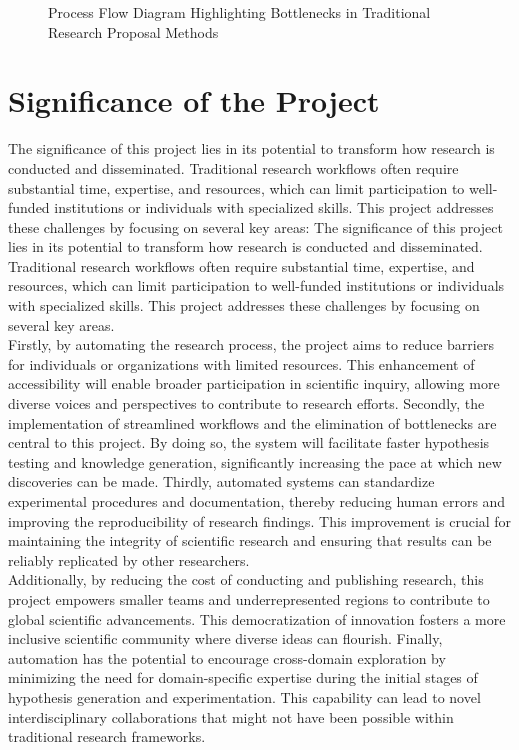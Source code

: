 \begin{figure}[htbp]
    \caption{Process Flow Diagram Highlighting Bottlenecks in Traditional Research Proposal Methods}
    \label{fig:bottlenecks} %
\end{figure}



\section{Significance of the Project}
The significance of this project lies in its potential to transform how research is conducted and disseminated. Traditional research workflows often require substantial time, expertise, and resources, which can limit participation to well-funded institutions or individuals with specialized skills. This project addresses these challenges by focusing on several key areas:
The significance of this project lies in its potential to transform how research is conducted and disseminated. Traditional research workflows often require substantial time, expertise, and resources, which can limit participation to well-funded institutions or individuals with specialized skills. This project addresses these challenges by focusing on several key areas.\\
Firstly, by automating the research process, the project aims to reduce barriers for individuals or organizations with limited resources. This enhancement of accessibility will enable broader participation in scientific inquiry, allowing more diverse voices and perspectives to contribute to research efforts. Secondly, the implementation of streamlined workflows and the elimination of bottlenecks are central to this project. By doing so, the system will facilitate faster hypothesis testing and knowledge generation, significantly increasing the pace at which new discoveries can be made. Thirdly, automated systems can standardize experimental procedures and documentation, thereby reducing human errors and improving the reproducibility of research findings. This improvement is crucial for maintaining the integrity of scientific research and ensuring that results can be reliably replicated by other researchers.\\
Additionally, by reducing the cost of conducting and publishing research, this project empowers smaller teams and underrepresented regions to contribute to global scientific advancements. This democratization of innovation fosters a more inclusive scientific community where diverse ideas can flourish. Finally, automation has the potential to encourage cross-domain exploration by minimizing the need for domain-specific expertise during the initial stages of hypothesis generation and experimentation. This capability can lead to novel interdisciplinary collaborations that might not have been possible within traditional research frameworks.


